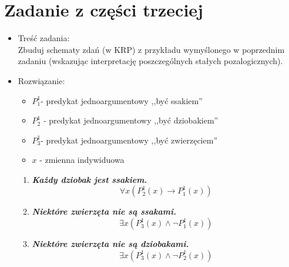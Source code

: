 \documentclass[12pt]{article}
\begin{document}
	\section{Zadanie z części trzeciej}
	\begin{itemize}
		\item Treść zadania: \vspace{0.5em} \\ Zbuduj schematy zdań (w KRP) z przykładu wymyślonego w poprzednim zadaniu (wskazując
		interpretację poszczególnych stałych pozalogicznych).
		\item Rozwiązanie: \\
		\begin{itemize}
			\item $P^1_1$- predykat jednoargumentowy ,,być ssakiem''
			\item $P^1_2$ - predykat jednoargumentowy ,,być dziobakiem''
			\item $P^1_3$- predykat jednoargumentowy ,,być zwierzęciem''
			\item $x$ - zmienna indywiduowa
		\end{itemize}
		\begin{enumerate}
			\item \textbf{\textit{Każdy dziobak jest ssakiem.}}
			\[ \forall x (P^1_2(x) \rightarrow P^1_1(x)) \]
			\item \textbf{\textit{Niektóre zwierzęta nie są ssakami.}}
			\[ \exists x (P^1_3(x) \wedge \neg P^1_1(x)) \]
			\item \textbf{\textit{Niektóre zwierzęta nie są dziobakami.}}
			\[\exists x (P^1_3(x) \wedge \neg P^1_2(x) ) \]			
		\end{enumerate}
		
	
		
	\end{itemize}
\end{document}
